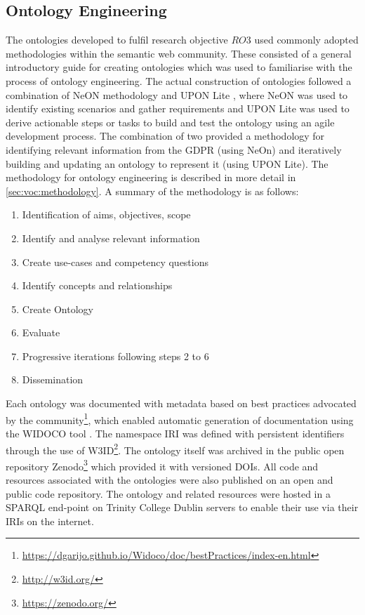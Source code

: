 \subsection{Ontology Engineering}\label{sec:intro:ontology-engineering}
The ontologies developed to fulfil research objective $RO3$ used commonly adopted methodologies within the semantic web community. These consisted of a general introductory guide for creating ontologies \cite{noy_ontology_2001} which was used to familiarise with the process of ontology engineering.
The actual construction of ontologies followed a combination of NeON methodology \cite{suarez-figueroa_neon_2012} and UPON Lite \cite{de_nicola_lightweight_2016}, where NeON was used to identify existing scenarios and gather requirements and UPON Lite was used to derive actionable steps or tasks to build and test the ontology using an agile development process.
The combination of two provided a methodology for identifying relevant information from the GDPR (using NeOn) and iteratively building and updating an ontology to represent it (using UPON Lite).
The methodology for ontology engineering is described in more detail in \autoref{sec:voc:methodology}.
A summary of the methodology is as follows:
\begin{enumerate}
	\item Identification of aims, objectives, scope
    \item Identify and analyse relevant information
    \item Create use-cases and competency questions
    \item Identify concepts and relationships
    \item Create Ontology
    \item Evaluate
    \item Progressive iterations following steps 2 to 6
    \item Dissemination
\end{enumerate}

Each ontology was documented with metadata based on best practices advocated by the community\footnote{\url{https://dgarijo.github.io/Widoco/doc/bestPractices/index-en.html}}, which enabled automatic generation of documentation using the WIDOCO tool \cite{garijo_widoco_2017}.
The namespace IRI was defined with persistent identifiers through the use of W3ID\footnote{\url{http://w3id.org/}}.
The ontology itself was archived in the public open repository Zenodo\footnote{\url{https://zenodo.org/}} which provided it with versioned DOIs.
All code and resources associated with the ontologies were also published on an open and public code repository.
The ontology and related resources were hosted in a SPARQL end-point on Trinity College Dublin servers to enable their use via their IRIs on the internet.

